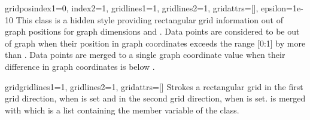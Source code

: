 \begin{classdesc}{gridpos}{index1=0, index2=1, %
                        gridlines1=1, gridlines2=1, gridattrs=[],
                        epsilon=1e-10}
  This class is a hidden style providing rectangular grid information
  out of graph positions for graph dimensions  and
  . Data points are considered to be out of graph when
  their position in graph coordinates exceeds the range [0:1] by more
  than . Data points are merged to a single graph
  coordinate value when their difference in graph coordinates is below
  .
\end{classdesc} %

\begin{classdesc}{grid}{gridlines1=1, gridlines2=1, gridattrs=[]} %
  Strokes a rectangular grid in the first grid direction, when
   is set and in the second grid direction, when
   is set.  is merged with
   which is a list containing the member
  variable  of the  class.
\end{classdesc} %

